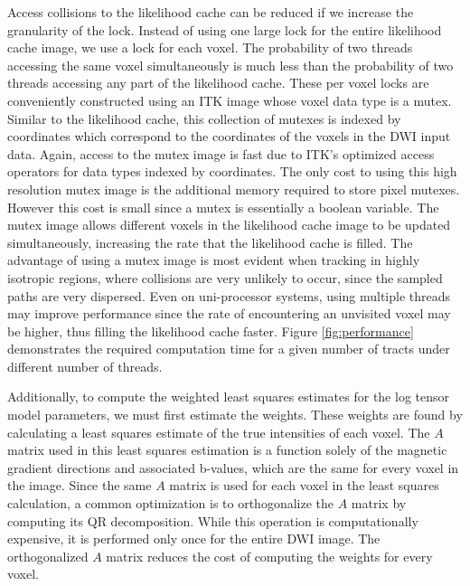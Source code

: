 Access collisions to the likelihood cache can be reduced if we increase the granularity of the lock.  Instead of using one large lock for the entire likelihood cache image, we use a lock for each voxel.  The probability of two threads accessing the same voxel simultaneously is much less than the probability of two threads accessing any part of the likelihood cache.  These per voxel locks are conveniently constructed using an ITK image whose voxel data type is a mutex.  Similar to the likelihood cache, this collection of mutexes is indexed by coordinates which correspond to the coordinates of the voxels in the DWI input data.  Again, access to the mutex image is fast due to ITK's optimized access operators for data types indexed by coordinates.  The only cost to using this high resolution mutex image is the additional memory required to store pixel mutexes.  However this cost is small since a mutex is essentially a boolean variable.  The mutex image allows different voxels in the likelihood cache image to be updated simultaneously, increasing the rate that the likelihood cache is filled.  The advantage of using a mutex image is most evident when tracking in highly isotropic regions,  where collisions are very unlikely to occur, since the sampled paths are very dispersed.  Even on uni-processor systems, using multiple threads may improve performance since the rate of encountering an unvisited voxel may be higher, thus filling the likelihood cache faster. Figure \ref{fig:performance} demonstrates the required computation time for a given number of tracts under different number of threads.

Additionally, to compute the weighted least squares estimates for the log tensor model parameters, we must first estimate the weights.  These weights are found by calculating a least squares estimate of the true intensities of each voxel.  The $A$ matrix used in this least squares estimation is a function solely of the magnetic gradient directions and associated b-values, which are the same for every voxel in the image.  Since the same $A$ matrix is used for each voxel in the least squares calculation, a common optimization is to orthogonalize the $A$ matrix by computing its QR decomposition.  While this operation is computationally expensive, it is performed only once for the entire DWI image.  The orthogonalized $A$ matrix reduces the cost of computing the weights for every voxel.

